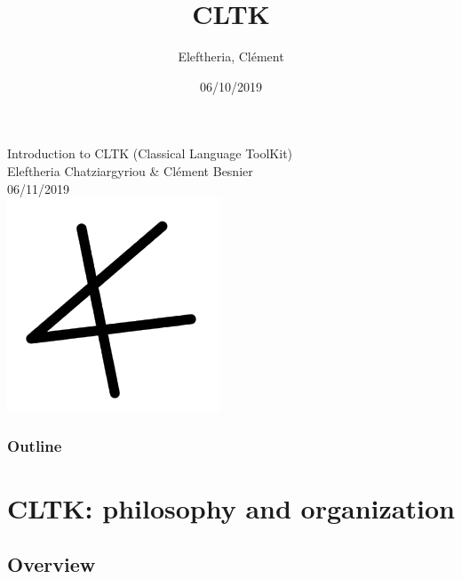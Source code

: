 \documentclass{beamer}
\title{CLTK}
\author{Eleftheria, Clément}
\institute{CLTK}
\date{06/10/2019}
\begin{document}
\begin{frame}
\begin{center}
    {\large Introduction to CLTK (Classical Language ToolKit)}\\
    Eleftheria Chatziargyriou \& Clément Besnier \\
    06/11/2019 \\
    \includegraphics[scale=0.5]{cltklogo.png}
\end{center}

\end{frame}

\begin{frame}
\frametitle{Outline}
\tableofcontents
\end{frame}

\section{CLTK: philosophy and organization}

\subsection{Overview}
\end{document}
